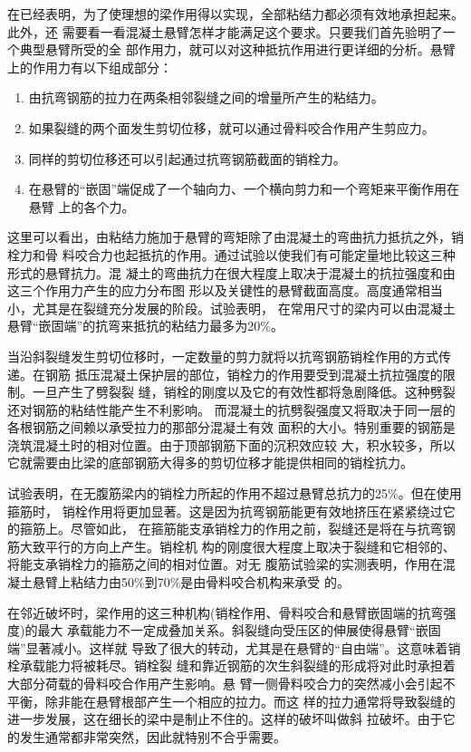 \documentclass[12pt,a4paper]{book}
\begin{document}
在已经表明，为了使理想的梁作用得以实现，全部粘结力都必须有效地承担起来。此外，还
需要看一看混凝土悬臂怎样才能满足这个要求。只要我们首先验明了一个典型悬臂所受的全
部作用力，就可以对这种抵抗作用进行更详细的分析。悬臂上的作用力有以下组成部分：
\begin{enumerate}
\item 由抗弯钢筋的拉力在两条相邻裂缝之间的增量所产生的粘结力。
\item 如果裂缝的两个面发生剪切位移，就可以通过骨料咬合作用产生剪应力。
\item 同样的剪切位移还可以引起通过抗弯钢筋截面的销栓力。
\item 在悬臂的“嵌固”端促成了一个轴向力、一个横向剪力和一个弯矩来平衡作用在悬臂
  上的各个力。
\end{enumerate}

这里可以看出，由粘结力施加于悬臂的弯矩除了由混凝土的弯曲抗力抵抗之外，销栓力和骨
料咬合力也起抵抗的作用。通过试验以使我们有可能定量地比较这三种形式的悬臂抗力。混
凝土的弯曲抗力在很大程度上取决于混凝土的抗拉强度和由这三个作用力产生的应力分布图
形以及关键性的悬臂截面高度。高度通常相当小，尤其是在裂缝充分发展的阶段。试验表明，
在常用尺寸的梁内可以由混凝土悬臂“嵌固端”的抗弯来抵抗的粘结力最多为20\%。

当沿斜裂缝发生剪切位移时，一定数量的剪力就将以抗弯钢筋销栓作用的方式传递。在钢筋
抵压混凝土保护层的部位，销栓力的作用要受到混凝土抗拉强度的限制。一旦产生了劈裂裂
缝，销栓的刚度以及它的有效性都将急剧降低。这种劈裂还对钢筋的粘结性能产生不利影响。
而混凝土的抗劈裂强度又将取决于同一层的各根钢筋之间赖以承受拉力的那部分混凝土有效
面积的大小。特别重要的钢筋是浇筑混凝土时的相对位置。由于顶部钢筋下面的沉积效应较
大，积水较多，所以它就需要由比梁的底部钢筋大得多的剪切位移才能提供相同的销栓抗力。

试验表明，在无腹筋梁内的销栓力所起的作用不超过悬臂总抗力的25\%。但在使用箍筋时，
销栓作用将更加显著。这是因为抗弯钢筋能更有效地挤压在紧紧绕过它的箍筋上。尽管如此，
在箍筋能支承销栓力的作用之前，裂缝还是将在与抗弯钢筋大致平行的方向上产生。销栓机
构的刚度很大程度上取决于裂缝和它相邻的、将能支承销栓力的箍筋之间的相对位置。对无
腹筋试验梁的实测表明，作用在混凝土悬臂上粘结力由50\%到70\%是由骨料咬合机构来承受
的。

在邻近破坏时，梁作用的这三种机构(销栓作用、骨料咬合和悬臂嵌固端的抗弯强度)的最大
承载能力不一定成叠加关系。斜裂缝向受压区的伸展使得悬臂“嵌固端”显著减小。这样就
导致了很大的转动，尤其是在悬臂的“自由端”。这意味着销栓承载能力将被耗尽。销栓裂
缝和靠近钢筋的次生斜裂缝的形成将对此时承担着大部分荷载的骨料咬合作用产生影响。悬
臂一侧骨料咬合力的突然减小会引起不平衡，除非能在悬臂根部产生一个相应的拉力。而这
样的拉力通常将导致裂缝的进一步发展，这在细长的梁中是制止不住的。这样的破坏叫做斜
拉破坏。由于它的发生通常都非常突然，因此就特别不合乎需要。
\end{document}
